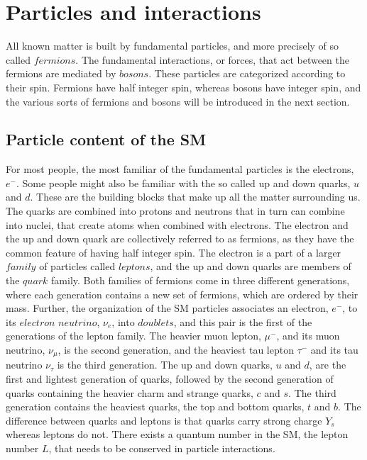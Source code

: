 \section{Particles and interactions}  
\noindent\justify
All known matter is built by fundamental particles, and more precisely of so called $fermions$. 
The fundamental interactions, or forces, that act between the fermions are mediated by $bosons$. 
These particles are categorized according to their spin. 
Fermions have half integer spin, whereas bosons have integer spin, and the various sorts of fermions and bosons will be introduced in the next section. 
\subsection*{Particle content of the SM}  
\noindent\justify
For most people, the most familiar of the fundamental particles is the electrons, $e^{-}$. 
Some people might also be familiar with the so called up and down quarks, $u$ and $d$. 
These are the building blocks that make up all the matter surrounding us. 
The quarks are combined into protons and neutrons that in turn can combine into nuclei, that create atoms when combined with electrons. 
The electron and the up and down quark are collectively referred to as fermions, as they have the common feature of having half integer spin. 
The electron is a part of a larger $family$ of particles called $leptons$, and the up and down quarks are members of the $quark$ family.
Both families of fermions come in three different generations, where each generation contains a new set of fermions, which are ordered by their mass. 
Further, the organization of the SM particles associates an electron, $e^{-}$, to its $electron$ $neutrino$, $\nu_{e}$, into $doublets$, and this pair is the first of the generations of the lepton family. 
The heavier muon lepton, $\mu^{-}$, and its muon neutrino, $\nu_{\mu}$, is the second generation, and the heaviest tau lepton $\tau^{-}$ and its tau neutrino $\nu_{\tau}$ is the third generation.  
The up and down quarks, $u$ and $d$, are the first and lightest generation of quarks, followed by the second generation of quarks containing the heavier charm and strange quarks, $c$ and $s$. 
The third generation contains the heaviest quarks, the top and bottom quarks, $t$ and $b$. 
The difference between quarks and leptons is that quarks carry strong charge $Y_{s}$ whereas leptons do not.
\newpara
\noindent\justify
There exists a quantum number in the SM, the lepton number $L$, that needs to be conserved in particle interactions.

